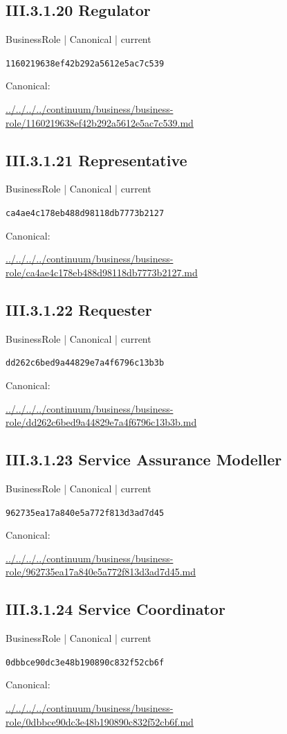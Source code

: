\documentclass[10pt,a4paper]{article}
\begin{document}
\subsection*{III.3.1.20 Regulator}
\label{element-1160219638ef42b292a5612e5ac7c539}
{\small BusinessRole | Canonical | current}\par
\texttt{1160219638ef42b292a5612e5ac7c539}\par
Canonical: \par
{\footnotesize\url{../../../../continuum/business/business-role/1160219638ef42b292a5612e5ac7c539.md}}\par
\subsection*{III.3.1.21 Representative}
\label{element-ca4ae4c178eb488d98118db7773b2127}
{\small BusinessRole | Canonical | current}\par
\texttt{ca4ae4c178eb488d98118db7773b2127}\par
Canonical: \par
{\footnotesize\url{../../../../continuum/business/business-role/ca4ae4c178eb488d98118db7773b2127.md}}\par
\subsection*{III.3.1.22 Requester}
\label{element-dd262c6bed9a44829e7a4f6796c13b3b}
{\small BusinessRole | Canonical | current}\par
\texttt{dd262c6bed9a44829e7a4f6796c13b3b}\par
Canonical: \par
{\footnotesize\url{../../../../continuum/business/business-role/dd262c6bed9a44829e7a4f6796c13b3b.md}}\par
\subsection*{III.3.1.23 Service Assurance Modeller}
\label{element-962735ea17a840e5a772f813d3ad7d45}
{\small BusinessRole | Canonical | current}\par
\texttt{962735ea17a840e5a772f813d3ad7d45}\par
Canonical: \par
{\footnotesize\url{../../../../continuum/business/business-role/962735ea17a840e5a772f813d3ad7d45.md}}\par
\subsection*{III.3.1.24 Service Coordinator}
\label{element-0dbbce90dc3e48b190890c832f52cb6f}
{\small BusinessRole | Canonical | current}\par
\texttt{0dbbce90dc3e48b190890c832f52cb6f}\par
Canonical: \par
{\footnotesize\url{../../../../continuum/business/business-role/0dbbce90dc3e48b190890c832f52cb6f.md}}\par
\end{document}
